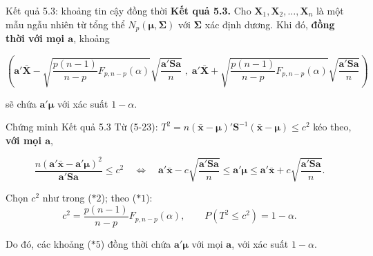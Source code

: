 \begin{frame}{Kết quả 5.3: khoảng tin cậy đồng thời}
\textbf{Kết quả 5.3.} Cho $\mathbf X_1,\mathbf X_2,\ldots,\mathbf X_n$ là một mẫu
ngẫu nhiên từ tổng thể $N_p(\boldsymbol\mu,\boldsymbol\Sigma)$ với $\boldsymbol\Sigma$
xác định dương. Khi đó, \textbf{đồng thời với mọi $\mathbf a$}, khoảng

\begin{keyformula}
{\small
\[
\left( \mathbf{a}'\bar{\mathbf{X}} - \sqrt{\frac{p(n-1)}{n-p}F_{p,n-p}(\alpha)} \sqrt{\frac{\mathbf{a}'\mathbf{S}\mathbf{a}}{n}} \; , \; \mathbf{a}'\bar{\mathbf{X}} + \sqrt{\frac{p(n-1)}{n-p}F_{p,n-p}(\alpha)} \sqrt{\frac{\mathbf{a}'\mathbf{S}\mathbf{a}}{n}} \right)
\tag{$*5$}
\]}
\end{keyformula}

sẽ chứa $\mathbf a'\boldsymbol\mu$ với xác suất $1-\alpha$.
\end{frame}

\begin{frame}{Chứng minh Kết quả 5.3}
Từ (5-23): $T^2=n(\bar{\mathbf x}-\boldsymbol\mu)'\mathbf S^{-1}(\bar{\mathbf x}-\boldsymbol\mu)\le c^2$
kéo theo, \textbf{với mọi $\mathbf a$},

\[
\frac{n(\mathbf a'\bar{\mathbf x}-\mathbf a'\boldsymbol\mu)^2}{\mathbf a'\mathbf S\mathbf a}\le c^2
\quad\Longleftrightarrow\quad
\mathbf a'\bar{\mathbf x}-c\sqrt{\frac{\mathbf a'\mathbf S\mathbf a}{n}}
\le \mathbf a'\boldsymbol\mu \le
\mathbf a'\bar{\mathbf x}+c\sqrt{\frac{\mathbf a'\mathbf S\mathbf a}{n}}.
\]

Chọn $c^2$ như trong ($*2$); theo ($*1$):
\[
c^2=\frac{p(n-1)}{n-p}F_{p,n-p}(\alpha),
\qquad
P\!\left(T^2\le c^2\right)=1-\alpha.
\]

Do đó, các khoảng ($*5$) đồng thời chứa $\mathbf a'\boldsymbol\mu$ với mọi
$\mathbf a$, với xác suất $1-\alpha$.

\end{frame}


